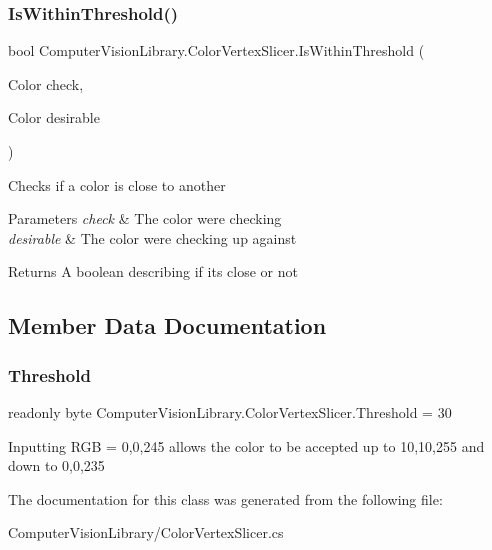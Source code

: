 \subsubsection{\texorpdfstring{Is\+Within\+Threshold()}{IsWithinThreshold()}}
{\footnotesize\ttfamily bool Computer\+Vision\+Library.\+Color\+Vertex\+Slicer.\+Is\+Within\+Threshold (\begin{DoxyParamCaption}\item[{Color}]{check,  }\item[{Color}]{desirable }\end{DoxyParamCaption})}



Checks if a color is close to another 


\begin{DoxyParams}{Parameters}
{\em check} & The color we\textquotesingle{}re checking\\
\hline
{\em desirable} & The color we\textquotesingle{}re checking up against\\
\hline
\end{DoxyParams}
\begin{DoxyReturn}{Returns}
A boolean describing if it\textquotesingle{}s close or not
\end{DoxyReturn}


\subsection{Member Data Documentation}
\hypertarget{class_computer_vision_library_1_1_color_vertex_slicer_a7313d6cee1d46433875b7aa61ec1d36e}{}\label{class_computer_vision_library_1_1_color_vertex_slicer_a7313d6cee1d46433875b7aa61ec1d36e} 
\subsubsection{\texorpdfstring{Threshold}{Threshold}}
{\footnotesize\ttfamily readonly byte Computer\+Vision\+Library.\+Color\+Vertex\+Slicer.\+Threshold = 30}



Inputting R\+GB = 0,0,245 allows the color to be accepted up to 10,10,255 and down to 0,0,235 



The documentation for this class was generated from the following file\+:\begin{DoxyCompactItemize}
\item 
Computer\+Vision\+Library/Color\+Vertex\+Slicer.\+cs\end{DoxyCompactItemize}
